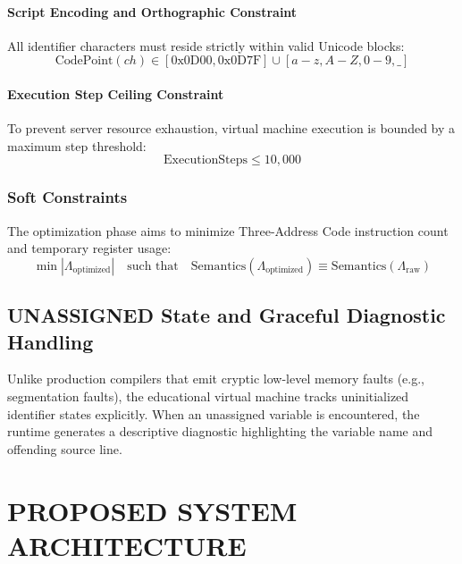 \documentclass[12pt,a4paper]{report}
\begin{document}
\subsubsection{Script Encoding and Orthographic Constraint}
All identifier characters must reside strictly within valid Unicode blocks:
\begin{equation}
    \text{CodePoint}(ch) \in [0\text{x0D00}, 0\text{x0D7F}] \cup [a-z, A-Z, 0-9, \_]
\end{equation}

\subsubsection{Execution Step Ceiling Constraint}
To prevent server resource exhaustion, virtual machine execution is bounded by a maximum step threshold:
\begin{equation}
    \text{ExecutionSteps} \le 10{,}000
\end{equation}

\subsection{Soft Constraints}
The optimization phase aims to minimize Three-Address Code instruction count and temporary register usage:
\begin{equation}
    \min |\Lambda_{\text{optimized}}| \quad \text{such that} \quad \text{Semantics}(\Lambda_{\text{optimized}}) \equiv \text{Semantics}(\Lambda_{\text{raw}})
\end{equation}

\section{UNASSIGNED State and Graceful Diagnostic Handling}
Unlike production compilers that emit cryptic low-level memory faults (e.g., segmentation faults), the educational virtual machine tracks uninitialized identifier states explicitly. When an unassigned variable is encountered, the runtime generates a descriptive diagnostic highlighting the variable name and offending source line.

\newpage
\chapter{PROPOSED SYSTEM ARCHITECTURE}
\end{document}

